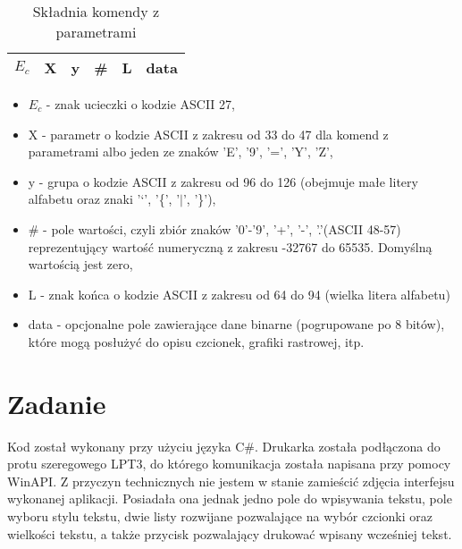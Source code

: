 \documentclass{article}
\begin{document}
\begin{table}[H]
    \centering
    \caption{Składnia komendy z parametrami}
    \begin{tabular}{|c|c|c|c|c|c|}
        \hline
        $E_{c}$ & X & y & \# & L & data \\
        \hline
    \end{tabular}
    \label{tab:parameter_command}
\end{table}

\begin{itemize}
    \item $E_{c}$ - znak ucieczki o kodzie ASCII 27,
    \item X - parametr o kodzie ASCII z zakresu od 33 do 47 dla komend z parametrami albo jeden ze znaków 'E', '9', '=', 'Y', 'Z',
    \item y - grupa o kodzie ASCII z zakresu od 96 do 126 (obejmuje małe litery alfabetu oraz znaki '`', '\{', '$|$', '\}'),
    \item \# - pole wartości, czyli zbiór znaków '0'-'9', '+', '-', '.'(ASCII 48-57) reprezentujący wartość numeryczną z zakresu -32767 do 65535. Domyślną wartością jest zero,
    \item L - znak końca o kodzie ASCII z zakresu od 64 do 94 (wielka litera alfabetu)
    \item data - opcjonalne pole zawierające dane binarne (pogrupowane po 8 bitów), które mogą posłużyć do opisu czcionek, grafiki rastrowej, itp.\citep{printerSpecs}
\end{itemize}

\section{Zadanie}
Kod został wykonany przy użyciu języka C\#. Drukarka została podłączona do protu szeregowego LPT3, do którego komunikacja została napisana przy pomocy WinAPI. Z przyczyn technicznych nie jestem w stanie zamieścić zdjęcia interfejsu wykonanej aplikacji. Posiadała ona jednak jedno pole do wpisywania tekstu, pole wyboru stylu tekstu, dwie listy rozwijane pozwalające na wybór czcionki oraz wielkości tekstu, a także przycisk pozwalający drukować wpisany wcześniej tekst.
\newline
\newline
\end{document}
